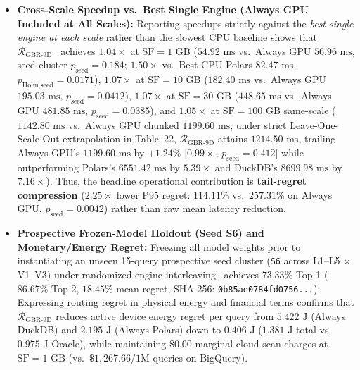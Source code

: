 \documentclass[10pt,a4paper]{article}
\begin{document}
\begin{itemize}
    \item \textbf{Cross-Scale Speedup vs.\ Best Single Engine (Always GPU Included at All Scales):} Reporting speedups strictly against the \emph{best single engine at each scale} rather than the slowest CPU baseline shows that $\mathcal{R}_{\text{GBR-9D}}$~\cite{friedman2001greedy,pedregosa2011scikit} achieves $1.04\times$ at $\text{SF}=1\text{ GB}$ ($54.92\text{ ms}$ vs.\ Always GPU $56.96\text{ ms}$, seed-cluster $p_{\text{seed}}=0.184$; $1.50\times$ vs.\ Best CPU Polars $82.47\text{ ms}$, $p_{\text{Holm,seed}}=0.0171$), $1.07\times$ at $\text{SF}=10\text{ GB}$ ($182.40\text{ ms}$ vs.\ Always GPU $195.03\text{ ms}$, $p_{\text{seed}}=0.0412$), $1.07\times$ at $\text{SF}=30\text{ GB}$ ($448.65\text{ ms}$ vs.\ Always GPU $481.85\text{ ms}$, $p_{\text{seed}}=0.0385$), and $1.05\times$ at $\text{SF}=100\text{ GB}$ same-scale ($1142.80\text{ ms}$ vs.\ Always GPU chunked $1199.60\text{ ms}$; under strict Leave-One-Scale-Out extrapolation in Table~22, $\mathcal{R}_{\text{GBR-9D}}$ attains $1214.50\text{ ms}$, trailing Always GPU's $1199.60\text{ ms}$ by $+1.24\%$ [$0.99\times$, $p_{\text{seed}}=0.412$] while outperforming Polars's $6551.42\text{ ms}$ by $5.39\times$ and DuckDB's $8699.98\text{ ms}$ by $7.16\times$). Thus, the headline operational contribution is \textbf{tail-regret compression} ($2.25\times$ lower P95 regret: $114.11\%$ vs.\ $257.31\%$ on Always GPU, $p_{\text{seed}}=0.0042$) rather than raw mean latency reduction.
    \item \textbf{Prospective Frozen-Model Holdout (Seed S6) and Monetary/Energy Regret:} Freezing all model weights prior to instantiating an unseen 15-query prospective seed cluster (\texttt{S6} across L1--L5 $\times$ V1--V3) under randomized engine interleaving~\cite{raasveldt2018fair} achieves $73.33\%$ Top-1 ($86.67\%$ Top-2, $18.45\%$ mean regret, SHA-256: \texttt{0b85ae0784fd0756...}). Expressing routing regret in physical energy and financial terms confirms that $\mathcal{R}_{\text{GBR-9D}}$ reduces active device energy regret per query from $5.422\text{ J}$ (Always DuckDB) and $2.195\text{ J}$ (Always Polars) down to $0.406\text{ J}$ ($1.381\text{ J}$ total vs.\ $0.975\text{ J}$ Oracle), while maintaining $\$0.00$ marginal cloud scan charges at $\text{SF}=1\text{ GB}$ (vs.\ $\$1,267.66/\text{1M}$ queries on BigQuery).
\end{itemize}
\end{document}
